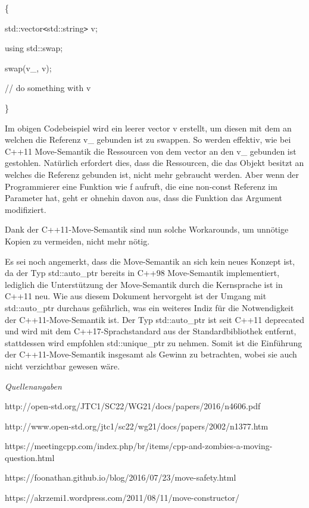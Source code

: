 \documentclass{article}
\begin{document}
\{    

\parindent=14pt
std::vector\texttt{<}std::string\texttt{>} v;    

using std::swap;    

\parindent=28pt
swap(v\_, v);    

\parindent=14pt
// do something with v

\parindent=0pt
\}

\vspace{12pt}
Im obigen Codebeispiel wird ein leerer vector v erstellt, um diesen mit dem an 
welchen die Referenz v\_ gebunden ist zu swappen. So werden effektiv, wie bei C++11 
Move-Semantik die Ressourcen von dem vector an den v\_ gebunden ist gestohlen. 
Natürlich erfordert dies, dass die Ressourcen, die das Objekt besitzt an welches 
die Referenz gebunden ist, nicht mehr gebraucht werden. Aber wenn der Programmierer 
eine Funktion wie f aufruft, die eine non-const Referenz im Parameter hat, geht 
er ohnehin davon aus, dass die Funktion das Argument modifiziert.

Dank der C++11-Move-Semantik sind nun solche Workarounds, um unnötige Kopien zu 
vermeiden, nicht mehr nötig.

Es sei noch angemerkt, dass die Move-Semantik an sich kein neues Konzept ist, da 
der Typ std::auto\_ptr bereits in C++98 Move-Semantik implementiert, lediglich 
die Unterstützung der Move-Semantik durch die Kernsprache ist in C++11 neu. Wie 
aus diesem Dokument hervorgeht ist der Umgang mit std::auto\_ptr durchaus gefährlich, 
was ein weiteres Indiz für die Notwendigkeit der C++11-Move-Semantik ist. Der 
Typ std::auto\_ptr ist seit C++11 deprecated und wird mit dem C++17-Sprachstandard 
aus der Standardbibliothek entfernt, stattdessen wird empfohlen std::unique\_ptr 
zu nehmen. Somit ist die Einführung der C++11-Move-Semantik insgesamt als Gewinn 
zu betrachten, wobei sie auch nicht verzichtbar gewesen wäre.

\vspace{12pt}
\emph{Quellenangaben}

http://open-std.org/JTC1/SC22/WG21/docs/papers/2016/n4606.pdf

http://www.open-std.org/jtc1/sc22/wg21/docs/papers/2002/n1377.htm

https://meetingcpp.com/index.php/br/items/cpp-and-zombies-a-moving-question.html

https://foonathan.github.io/blog/2016/07/23/move-safety.html

https://akrzemi1.wordpress.com/2011/08/11/move-constructor/
\end{document}
